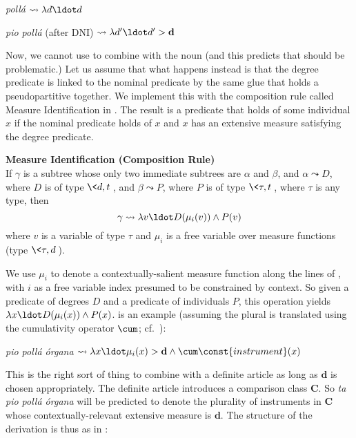 \documentclass[output=paper
,modfonts
,nonflat]{langsci/langscibook}
\begin{document}
\ea \label{ex:coppockstrand:96} 
\textit{pollá} $\leadsto \lambda d \ldot d$ 
\z 

\ea \label{ex:coppockstrand:97}
\textit{pio pollá} (after DNI) $\leadsto \lambda d' \ldot d' > \textbf{d}$ 
\z 

Now, we cannot use  to combine with the noun (and this predicts that  should be problematic.) Let us assume that what happens instead is that the degree predicate is linked to the nominal predicate by the same glue that holds a pseudopartitive together. We implement this with the composition rule called Measure Identification in . The result is a predicate that holds of some individual $x$ if the nominal predicate holds of $x$ and $x$ has an extensive measure satisfying the degree predicate. 

\ea \label{ex:coppockstrand:98}
\textbf{Measure Identification (Composition Rule)}\\
If $\gamma$ is a subtree whose only two immediate subtrees are $\alpha$ and $\beta$, and $\alpha\leadsto D$, where $D$ is of type $\<d,t\>$, and $\beta\leadsto P$, where $P$ is of type $\<\tau,t\>$, where $\tau$ is any type, then $$\gamma\leadsto \lambda v \ldot D(\mu_i(v)) \land P(v)$$ where $v$ is a variable of type $\tau$ and $\mu_i$ is a free variable over measure functions (type $\<\tau,d\>$).
\z 

We use $\mu_i$ to denote a contextually-salient measure function along the lines of \citet{Wellwood2014}, with $i$ as a free variable index presumed to be constrained by context. So given a predicate of degrees $D$ and a predicate of individuals $P$, this operation yields $\lambda x \ldot D(\mu_i(x)) \land P(x)$. 
 is an example (assuming the plural is translated using the cumulativity operator $\cum$; cf.\ \citealt{Link1983}):

\ea \label{ex:coppockstrand:99}
\textit{pio pollá órgana} $\leadsto \lambda x \ldot \mu_i(x) > \textbf{d} \land \cum\const{instrument}(x)$ 
\z 

This is the right sort of thing to combine with a definite article as long as $\textbf{d}$ is chosen appropriately. The definite article introduces a comparison class $\textbf{C}$. So \textit{ta pio pollá órgana} will be predicted to denote the plurality of instruments in $\textbf{C}$ whose contextually-relevant extensive measure is $\textbf{d}$. The structure of the derivation is thus as in :
\end{document}
